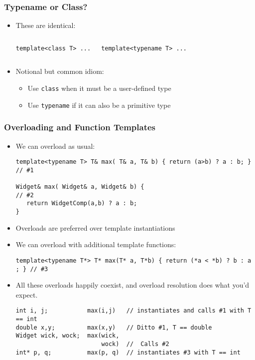 \begin{frame}[fragile,t]
\frametitle{Typename or Class?}
\begin{itemize}[<+->]
\item These are identical:
\begin{columns}[t]
{\scriptsize
\begin{verbatim}
template<class T> ...
\end{verbatim}
}
{\scriptsize
\begin{verbatim}
template<typename T> ...
\end{verbatim}
}
\end{columns}
\vskip 12pt
\item Notional but common idiom:
\begin{itemize}
\item Use \texttt{class} when it must be a user-defined type
\item Use \texttt{typename} if it can also be a primitive type
\end{itemize}
\end{itemize}
\end{frame}


\begin{frame}[fragile,t]
\frametitle{Overloading and Function Templates}
\begin{itemize}[<+->]
\item We can overload as usual:
{\scriptsize
\begin{verbatim}
template<typename T> T& max( T& a, T& b) { return (a>b) ? a : b; }  // #1

Widget& max( Widget& a, Widget& b) {                                // #2
   return WidgetComp(a,b) ? a : b; 
}
\end{verbatim}
}
\item Overloads are preferred over template instantiations
\item We can overload with additional template functions:
{\scriptsize
\begin{verbatim}
template<typename T*> T* max(T* a, T*b) { return (*a < *b) ? b : a ; } // #3
\end{verbatim}
}
\item All these overloads happily coexist, and overload resolution does what you'd expect.
{\scriptsize
\begin{verbatim}
int i, j;           max(i,j)   // instantiates and calls #1 with T == int
double x,y;         max(x,y)   // Ditto #1, T == double
Widget wick, wock;  max(wick,
                        wock)  //  Calls #2
int* p, q;          max(p, q)  // instantiates #3 with T == int
\end{verbatim}
}
\end{itemize}

\end{frame}



